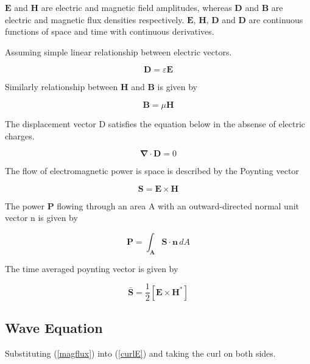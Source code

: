 $\mathbf{E}$ and $\mathbf{H}$ are electric and magnetic field
amplitudes, whereas $\mathbf{D}$ and $\mathbf{B}$ are electric and
magnetic flux densities respectively. $\mathbf{E}$, $\mathbf{H}$,
$\mathbf{D}$ and $\mathbf{D}$ are continuous functions of space and
time with continuous derivatives.

Assuming simple linear relationship between electric vectors.

\begin{equation}
\mathbf{D} = \varepsilon \mathbf{E}
\label{Ddef}
\end{equation}

Similarly relationship between $\mathbf{H}$ and $\mathbf{B}$ is given by

\begin{equation}
\mathbf{B} = \mu \mathbf{H}
\label{magflux}
\end{equation}

The displacement vector D satisfies the equation below in the absense
of electric charges.

\begin{equation}
\mathbf{\nabla \cdot D} = 0
\label{defD0}
\end{equation}

The flow of electromagnetic power is space is described by the Poynting vector

\begin{equation}
\mathbf{S} = \mathbf{E} \times \mathbf{H}
\end{equation}

The power $\mathbf{P}$ flowing through an area A with an outward-directed normal unit vector n is given by

\begin{equation}
\mathbf{P} = \int_{\mathbf{A}} \mathbf{S} \cdot \mathbf{n}\, d{A}
\end{equation}

The time averaged poynting vector is given by

\begin{equation}
\mathbf{\bar{S}} = \frac{1}{2}[\mathbf{E} \times \mathbf{H^*}]
\end{equation}

\subsection{Wave Equation}

Substituting (\ref{magflux}) into (\ref{curlE}) and taking the curl on
both sides.

